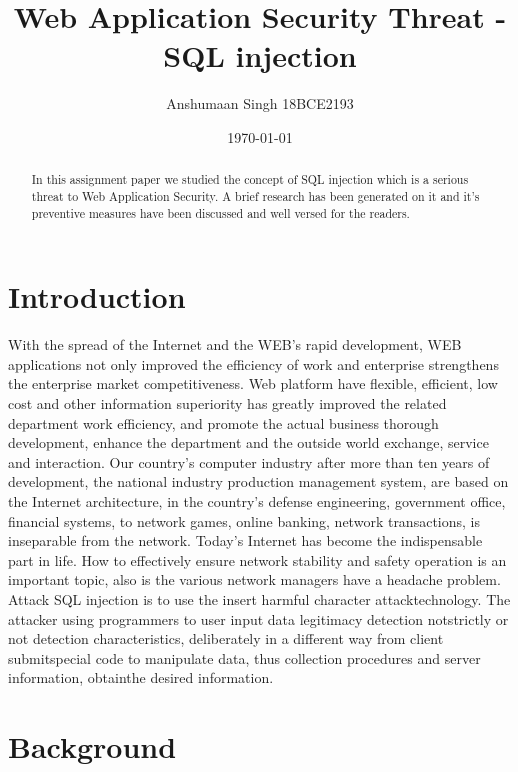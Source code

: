 \documentclass[letterpaper,12pt]{article}
\begin{document}
\title{Web Application Security Threat - SQL injection}
\author{Anshumaan Singh 18BCE2193}
\date{\today}
\maketitle

\begin{abstract}
In this assignment paper we studied the concept of SQL injection which is a serious threat to Web Application Security. A brief research has been generated on it and it's preventive measures have been discussed and well versed for the readers.   
\end{abstract}


\section{Introduction}

With the spread of the Internet and the WEB's rapid development, WEB applications not only improved the efficiency of work and enterprise strengthens the enterprise market competitiveness. Web platform have flexible, efficient, low cost and other information superiority has greatly improved the related department work efficiency, and promote the actual business thorough development, enhance
the department and the outside world exchange, service and interaction. Our country's computer
industry after more than ten years of development, the national industry production management
system, are based on the Internet architecture, in the country's defense engineering, government office,
financial systems, to network games, online banking, network transactions, is inseparable from the
network. Today's Internet has become the indispensable part in life. How to effectively ensure network
stability and safety operation is an important topic, also is the various network managers have a
headache problem. 
Attack  SQL  injection  is  to  use  the  insert  harmful  character  attacktechnology.   The  attacker  using  programmers  to  user  input  data  legitimacy  detection  notstrictly or not detection characteristics,  deliberately in a different way from client submitspecial code to manipulate data, thus collection procedures and server information, obtainthe desired information.




\section{Background}
\end{document}
